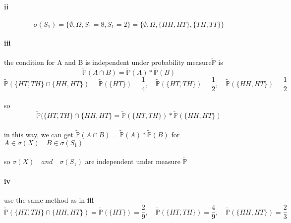 \documentclass{article}
\begin{document}
{\paragraph{ii}
\begin{displaymath}
\sigma(S_{1})=\{\emptyset,\Omega,S_{1}=8,S_{1}=2\}=\{\emptyset,\Omega,\{HH,HT\},\{TH,TT\}\}
\end{displaymath}

\paragraph{iii}{the condition for A and B is independent under probability measure$\tilde{\mathbb{P}}$ is}
\begin{displaymath}
  \tilde{\mathbb{P}}(A\cap B)=\tilde{\mathbb{P}}(A)*\tilde{\mathbb{P}}(B)
\end{displaymath}
\begin{displaymath}
  \tilde{\mathbb{P}}(\{HT,TH\}\cap\{HH,HT\})=\tilde{\mathbb{P}}(\{HT\})=\frac{1}{4},\quad\tilde{\mathbb{P}}(\{HT,TH\})=\frac{1}{2},\quad\tilde{\mathbb{P}}(\{HH,HT\})=\frac{1}{2}
\end{displaymath}
\paragraph{}{so\begin{displaymath}
                 \tilde{\mathbb{P}}(\{HT,TH\}\cap\{HH,HT\}=\tilde{\mathbb{P}}(\{HT,TH\})*\tilde{\mathbb{P}}(\{HH,HT\})
               \end{displaymath}}
\paragraph{}{in this way, we can get $\tilde{\mathbb{P}}(A\cap B)=\tilde{\mathbb{P}}(A)*\tilde{\mathbb{P}}(B)$ for $A\in\sigma(X)\quad B\in\sigma(S_{1})$}
\paragraph{}{so $\sigma(X)\quad and\quad \sigma(S_{1})$ are independent under measure $\tilde{\mathbb{P}}$ }

\paragraph{iv}{use the same method as in \textbf{iii}}
\begin{displaymath}
  \tilde{\mathbb{P}}(\{HT,TH\}\cap\{HH,HT\})=\tilde{\mathbb{P}}(\{HT\})=\frac{2}{9},\quad\tilde{\mathbb{P}}(\{HT,TH\})=\frac{4}{9},\quad\tilde{\mathbb{P}}(\{HH,HT\})=\frac{2}{3}
\end{displaymath}
}
\end{document}
